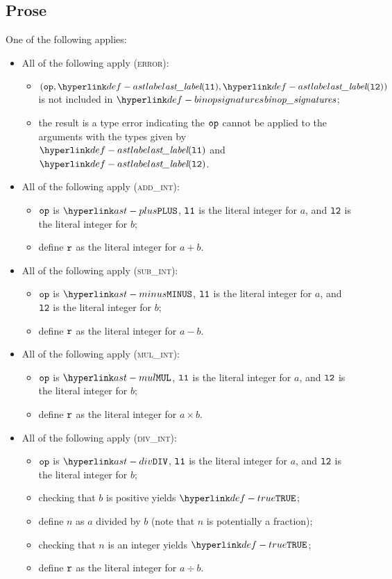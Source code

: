 \subsection{Prose}
One of the following applies:
\begin{itemize}
  \item All of the following apply (\textsc{error}):
  \begin{itemize}
    \item $(\op, \astlabel(\vlone), \astlabel(\vltwo))$ is not included in $\binopsignatures$;
    \item the result is a type error indicating the $\texttt{op}$ cannot be applied to the arguments
          with the types given by $\astlabel(\vlone)$ and $\astlabel(\vltwo)$.
  \end{itemize}

  \item All of the following apply (\textsc{add\_int}):
  \begin{itemize}
    \item $\texttt{op}$ is $\PLUS$, $\texttt{l1}$ is the literal integer for $a$, and $\texttt{l2}$ is the literal integer for $b$;
    \item define $\texttt{r}$ as the literal integer for $a+b$.
  \end{itemize}

  \item All of the following apply (\textsc{sub\_int}):
  \begin{itemize}
    \item $\texttt{op}$ is $\MINUS$, $\texttt{l1}$ is the literal integer for $a$, and $\texttt{l2}$ is the literal integer for $b$;
    \item define $\texttt{r}$ as the literal integer for $a-b$.
  \end{itemize}

  \item All of the following apply (\textsc{mul\_int}):
  \begin{itemize}
    \item $\texttt{op}$ is $\MUL$, $\texttt{l1}$ is the literal integer for $a$, and $\texttt{l2}$ is the literal integer for $b$;
    \item define $\texttt{r}$ as the literal integer for $a\times b$.
  \end{itemize}

  \item All of the following apply (\textsc{div\_int}):
  \begin{itemize}
    \item $\texttt{op}$ is $\DIV$, $\texttt{l1}$ is the literal integer for $a$, and $\texttt{l2}$ is the literal integer for $b$;
    \item checking that $b$ is positive yields $\True$\ProseOrTypeError;
    \item define $n$ as $a$ divided by $b$ (note that $n$ is potentially a fraction);
    \item checking that $n$ is an integer yields $\True$\ProseOrTypeError;
    \item define $\texttt{r}$ as the literal integer for $a\div b$.
  \end{itemize}


\end{itemize}
